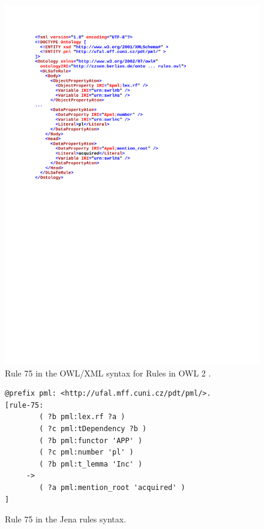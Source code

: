 \documentclass[10pt, conference, compsocconf]{IEEEtran}
\begin{document}
\begin{figure}
\centerline{\includegraphics[width=\hsize]{rules_owl_xml}}
\caption{Rule 75 in the OWL/XML syntax for Rules in OWL 2 \cite{GHPP09a}.}
\label{img:rules_xml}
\end{figure}


\begin{figure}
\small
\begin{verbatim}
@prefix pml: <http://ufal.mff.cuni.cz/pdt/pml/>.
[rule-75:  
        ( ?b pml:lex.rf ?a )
        ( ?c pml:tDependency ?b )
        ( ?b pml:functor 'APP' )
        ( ?c pml:number 'pl' )
        ( ?b pml:t_lemma 'Inc' )
     -> 
        ( ?a pml:mention_root 'acquired' )
]
\end{verbatim}
\caption{Rule 75 in the Jena rules syntax.}
\label{img:rules_jena}
\end{figure}
\end{document}
